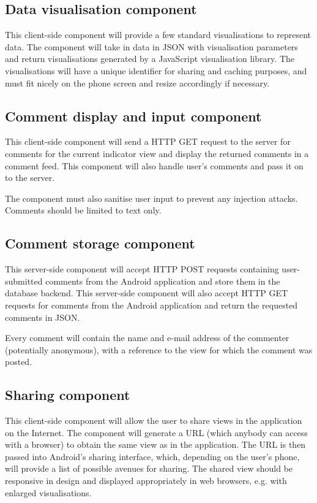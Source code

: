 \documentclass[12pt,a4paper,twoside]{article}
\begin{document}
\subsection{Data visualisation component}
This client-side component will provide a few standard visualisations to represent data. The component will take in data in JSON with visualisation parameters and return visualisations generated by a JavaScript visualisation library. The visualisations will have a unique identifier for sharing and caching purposes, and must fit nicely on the phone screen and resize accordingly if necessary.

\subsection{Comment display and input component}
This client-side component will send a HTTP GET request to the server for comments for the current indicator view and display the returned comments in a comment feed. This component will also handle user's comments and pass it on to the server.

The component must also sanitise user input to prevent any injection attacks. Comments should be limited to text only.

\subsection{Comment storage component}
This server-side component will accept HTTP POST requests containing user-submitted comments from the Android application and store them in the database backend. This server-side component will also accept HTTP GET requests for comments from the Android application and return the requested comments in JSON.

Every comment will contain the name and e-mail address of the commenter (potentially anonymous), with a reference to the view for which the comment was posted.

\subsection{Sharing component}
This client-side component will allow the user to share views in the application on the Internet. The component will generate a URL (which anybody can access with a browser) to obtain the same view as in the application. The URL is then passed into Android's sharing interface, which, depending on the user's phone, will provide a list of possible avenues for sharing. The shared view should be responsive in design and displayed appropriately in web browsers, e.g. with enlarged visualisations.
\end{document}
